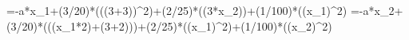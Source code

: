 =-a*x_1+(3/20)*\sin(((3+3))^2)+(2/25)*\cos((3*x_2))+(1/100)*((x_1)^2)
=-a*x_2+(3/20)*\sin(((x_1*2)+(3+2)))+(2/25)*\cos((x_1)^2)+(1/100)*((x_2)^2)
